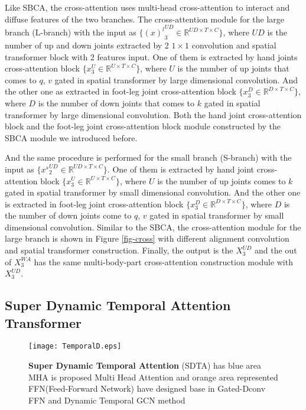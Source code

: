 \documentclass{bmvc2k}
\begin{document}
Like SBCA, the cross-attention uses multi-head cross-attention to interact and diffuse features of the two branches. The cross-attention module for the large branch (L-branch) with the input as $\{{(x)^{l}}^{\mathit{UD}}_{3}\in\mathbb{R}^{\mathit{UD}\times T\times C}\}$, where $\mathit{UD}$ is the number of up and down joints extracted by 2 $1\times1$ convolution and spatial transformer block with 2 features input. One of them is  extracted by hand joints cross-attention block $\{{x}^{U}_{3}\in\mathbb{R}^{U\times T\times C}\}$, where $\mathit{U}$ is the number of up joints that comes to $q$, $v$ gated in spatial transformer by large dimensional convolution. And the other one as extracted in foot-leg joint cross-attention block $\{{x}^{D}_{3}\in\mathbb{R}^{D\times T\times C}\}$, where $D$ is the number of down joints that comes to $k$ gated in spatial transformer by large dimensional convolution. Both the hand joint cross-attention block and the foot-leg joint cross-attention block module constructed by the SBCA module we introduced before.

And the same procedure is performed for the small branch (S-branch) with the input as $\{{x^{s}}^{\mathit{UD}}_{2}\in\mathbb{R}^{\mathit{UD}\times T\times C}\}$.
One of them is extracted by hand joint cross-attention block $\{{x}^{U}_{3}\in\mathbb{R}^{U\times T\times C}\}$, where $U$ is the number of up joints comes to $k$ gated in spatial transformer by small dimensional convolution. And the other one is extracted in foot-leg joint cross-attention block $\{{x}^{D}_{3}\in\mathbb{R}^{D\times T\times C}\}$, where $D$ is the number of down joints come to $q$, $v$ gated in spatial transformer by small dimensional convolution. Similar to the SBCA, the cross-attention module for the large branch is shown in Figure \ref{fig-cross} with different alignment convolution and spatial transformer construction. Finally, the output is the ${X}^{\mathit{UD}}_{3}$ and the out of ${X}^{\mathit{WA}}_{3}$ has the same multi-body-part cross-attention construction module with ${X}^{\mathit{UD}}_{3}$.










\subsection{Super Dynamic Temporal Attention Transformer}
\begin{figure*}
\begin{center}
\texttt{[image: TemporalD.eps]}
\end{center}
   \caption{\textbf{Super Dynamic Temporal Attention} (SDTA) has blue area MHA is proposed Multi Head Attention and orange area represented FFN(Feed-Forward Network) have designed base in Gated-Dconv FFN\cite{Syed-2022} and Dynamic Temporal GCN method \cite{Haodong-2022}}
\label{fig-sdta}
\end{figure*}
\end{document}
